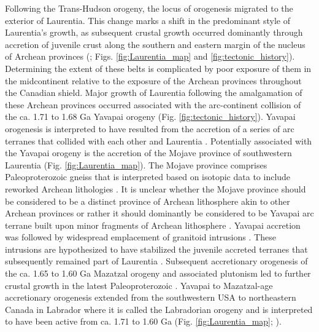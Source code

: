 \documentclass[twocolumn, switch]{article} %
\begin{document}
Following the Trans-Hudson orogeny, the locus of orogenesis migrated to the exterior of Laurentia. This change marks a shift in the predominant style of Laurentia's growth, as subsequent crustal growth occurred dominantly through accretion of juvenile crust along the southern and eastern margin of the nucleus of Archean provinces (\citealp{Whitmeyer2007a}; Figs. \ref{fig:Laurentia_map} and \ref{fig:tectonic_history}). Determining the extent of these belts is complicated by poor exposure of them in the midcontinent relative to the exposure of the Archean provinces throughout the Canadian shield. Major growth of Laurentia following the amalgamation of these Archean provinces occurred associated with the arc-continent collision of the ca. 1.71 to 1.68 Ga Yavapai orogeny (Fig. \ref{fig:tectonic_history}). Yavapai orogenesis is interpreted to have resulted from the accretion of a series of arc terranes that collided with each other and Laurentia \citep{Karlstrom2001a}. Potentially associated with the Yavapai orogeny is the accretion of the Mojave province of southwestern Laurentia (Fig. \ref{fig:Laurentia_map}). The Mojave province comprises Paleoproterozoic gneiss that is interpreted based on isotopic data to include reworked Archean lithologies \citep{Bennett1987a}. It is unclear whether the Mojave province should be considered to be a distinct province of Archean lithosphere akin to other Archean provinces or rather it should dominantly be considered to be Yavapai arc terrane built upon minor fragments of Archean lithosphere \citep{Whitmeyer2007a}. Yavapai accretion was followed by widespread emplacement of granitoid intrusions \citep{Whitmeyer2007a}. These intrusions are hypothesized to have stabilized the juvenile accreted terranes that subsequently remained part of Laurentia \citep{Whitmeyer2007a}. Subsequent accretionary orogenesis of the ca. 1.65 to 1.60 Ga Mazatzal orogeny and associated plutonism led to further crustal growth in the latest Paleoproterozoic \citep{Karlstrom1988a}. Yavapai to Mazatzal-age accretionary orogenesis extended from the southwestern USA to northeastern Canada in Labrador where it is called the Labradorian orogeny and is interpreted to have been active from ca. 1.71 to 1.60 Ga (Fig. \ref{fig:Laurentia_map}; \citealp{Gower1992a, Gower2008b}). 
\end{document}
